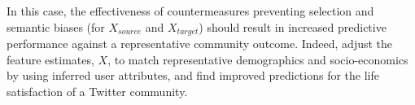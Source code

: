 In this case, the effectiveness of countermeasures preventing selection and semantic biases (for $X_{source}$ and $X_{target}$) should result in increased predictive performance against a representative community outcome. 
Indeed,  adjust the feature estimates, $X$, to match representative demographics and socio-economics by using inferred user attributes, and find improved predictions for the life satisfaction of a Twitter community. 
